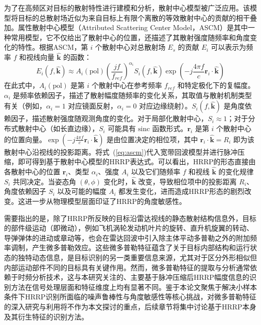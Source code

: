 为了在高频区对目标的散射特性进行建模和分析，散射中心模型被广泛应用。该模型将目标的总散射场近似为来自目标上有限个离散的等效散射中心的贡献的相干叠加。属性散射中心模型（Attributed Scattering Center Model，ASCM）是其中一种常用模型，它不仅给出了散射中心的位置，还描述了其散射强度随频率和角度变化的特性。根据ASCM，第 $i$ 个散射中心对总散射场 $E_s$ 的贡献 $E_i$ 可以表示为频率 $f$ 和视线向量 $\hat{\mathbf{k}}$ 的函数：
\begin{equation}
    E_i(f, \hat{\mathbf{k}}) \approx A_i(\text{pol}) \left(\frac{j f}{f_{ref}}\right)^{\alpha_i} S_i(f, \hat{\mathbf{k}}) \exp\left(-j \frac{4\pi f}{c} \mathbf{r}_i \cdot \hat{\mathbf{k}}\right)
    \label{eq:ascm}
\end{equation}
在此式中，$A_i(\text{pol})$ 是第 $i$ 个散射中心在参考频率 $f_{ref}$ 和特定极化下的复幅度。$\alpha_i$ 是频率依赖因子，描述了散射幅度随频率的变化关系，其取值与散射机制类型有关（例如，$\alpha_i=1$ 对应镜面反射，$\alpha_i=0$ 对应边缘绕射）。$S_i(f, \hat{\mathbf{k}})$ 是角度依赖因子，描述散射强度随观测角度的变化。对于局部化散射中心，$S_i \approx 1$；对于分布式散射中心（如长直边缘），$S_i$ 可能具有 $\text{sinc}$ 函数形式。$\mathbf{r}_i$ 是第 $i$ 个散射中心的位置向量。$\exp(-j \frac{4\pi f}{c} \mathbf{r}_i \cdot \hat{\mathbf{k}})$ 是由位置决定的相位项，其中 $\mathbf{r}_i \cdot \hat{\mathbf{k}} = R_i$ 即为该散射中心沿视线的投影距离。将式~(\ref{eq:ascm})代入宽带回波模型并进行脉冲压缩，即可得到基于散射中心模型的HRRP表达式。可以看出，HRRP的形态直接由各散射中心的位置 $\mathbf{r}_i$、类型 $\alpha_i$、强度 $A_i$ 以及它们随频率 $f$ 和视线 $\hat{\mathbf{k}}$ 的变化规律 $S_i$ 共同决定。当姿态角 $(\theta, \phi)$ 变化时，$\hat{\mathbf{k}}$ 改变，导致相位项中的投影距离 $R_i$、角度依赖因子 $S_i$ 以及可能的幅度 $A_i$ 都发生变化，进而造成HRRP形态的剧烈改变。这进一步从物理模型层面印证了HRRP的角度敏感性。

需要指出的是，除了HRRP所反映的目标沿雷达视线的静态散射结构信息外，目标的部件级运动（即微动），例如飞机涡轮发动机叶片的旋转、直升机旋翼的转动、导弹弹体的进动或章动等，也会在雷达回波中引入除主体平动多普勒之外的附加频率调制，产生微多普勒效应。这些微多普勒特征蕴含了关于目标内部结构和运行状态的独特动态信息，是目标识别的另一类重要信息来源，尤其对于区分外形相似但内部运动部件不同的目标具有关键作用。然而，微多普勒特征的提取与分析通常依赖于时频分析技术，这与本研究关注的、主要基于脉冲压缩后HRRP幅度信息的识别方法在信号处理层面和特征维度上均有显著不同。鉴于本论文聚焦于解决小样本条件下HRRP识别所面临的噪声鲁棒性与角度敏感性等核心挑战，对微多普勒特征的深入研究与利用将不作为本文探讨的重点，后续章节将集中讨论基于HRRP本身及其衍生特征的识别方法。

